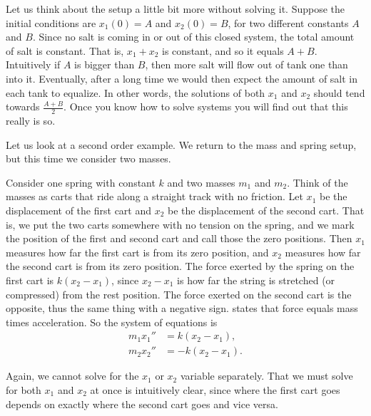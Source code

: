 \begin{example}
Let us think about the setup a little bit more without solving it.  Suppose the
initial conditions are $x_1(0) = A$ and $x_2(0) = B$, for two different
constants $A$ and $B$.  Since no salt is coming in or out of this closed system,
the total amount of salt is constant.  That is, $x_1+x_2$ is constant,
and so it equals $A+B$.
Intuitively if $A$ is bigger than $B$, then more salt will flow out of tank
one than into it.  Eventually, after a long time we would then expect
the amount of salt in each tank to equalize. In other words,
the solutions of both $x_1$ and $x_2$ should
tend towards $\frac{A+B}{2}$.  Once you know how to solve systems
you will find out that this really is so.
\end{example}

\begin{example} \label{sintro:carts-example}
Let us look at a second order example.
We return to the mass and spring setup, but this time we
consider two masses.

\begin{mywrapfigsimp}{2.0in}{2.3in}
\noindent
{}
\end{mywrapfigsimp}
Consider one spring with constant $k$ and two masses $m_1$
and $m_2$.  Think of the masses as carts that 
ride along a straight track with no friction.  Let $x_1$ be the displacement of the first
cart and $x_2$ be the displacement of the second cart.
That is, we put the two
carts somewhere with no tension on the spring, and we mark the position of
the first and second cart and call those the zero positions.
Then $x_1$ measures how far the first cart is from its zero position,
and $x_2$ measures how far the second cart is from its zero position.
The force exerted by the spring on the first cart is
$k(x_2-x_1)$,
since $x_2-x_1$ is how far the string is stretched (or compressed) from
the rest position.  The force exerted on the second cart is the opposite,
thus the same thing with a negative sign.
 states that
force equals mass times acceleration.  So the system of equations is
\begin{equation*}
\begin{aligned}
m_1 x_1'' & = k(x_2-x_1) , \\
m_2 x_2'' & = - k(x_2-x_1) .
\end{aligned}
\end{equation*}

Again, we cannot solve for the $x_1$ or $x_2$ variable separately.
That we must solve for both $x_1$ and $x_2$ at once
is intuitively clear, since where the first cart goes
depends on exactly where the second cart goes and vice versa.
\end{example}

